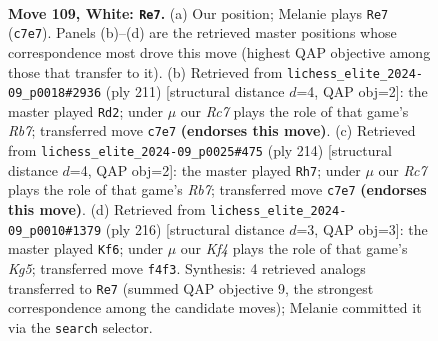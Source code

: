 \documentclass[11pt]{article}
\begin{document}
\clearpage

\begin{figure}[p]\centering
\begin{subfigure}{0.46\textwidth}\centering
\resizebox{\linewidth}{!}{%
\newchessgame
\chessboard[
  setfen={8/2R5/8/3k4/5KP1/1N6/7r/8 w - - 1 109},
  showmover=false,
  pgfstyle=straightmove, color=movearrow, markmove={c7-e7}
]}
\caption{}
\end{subfigure}\hfill
\begin{subfigure}{0.46\textwidth}\centering
\resizebox{\linewidth}{!}{%
\newchessgame
\chessboard[
  setfen={8/8/8/8/5pk1/R7/1r6/6K1 b - - 11 106},
  showmover=false,
  pgfstyle=straightmove, color=movearrow, markmove={b2-d2}
]}
\caption{}
\end{subfigure}
\\[4pt]
\begin{subfigure}{0.46\textwidth}\centering
\resizebox{\linewidth}{!}{%
\newchessgame
\chessboard[
  setfen={4k3/1R6/2r5/5PK1/8/8/8/8 w - - 3 108},
  showmover=false,
  pgfstyle=straightmove, color=movearrow, markmove={b7-h7}
]}
\caption{}
\end{subfigure}\hfill
\begin{subfigure}{0.46\textwidth}\centering
\resizebox{\linewidth}{!}{%
\newchessgame
\chessboard[
  setfen={8/7k/8/5PK1/8/4R3/8/r7 w - - 0 109},
  showmover=false,
  pgfstyle=straightmove, color=movearrow, markmove={g5-f6}
]}
\caption{}
\end{subfigure}
\caption{\textbf{Move 109, White: \texttt{Re7}.} (a) Our position; Melanie plays \texttt{Re7} (\texttt{c7e7}). Panels (b)--(d) are the retrieved master positions whose correspondence most drove this move (highest QAP objective among those that transfer to it). (b) Retrieved from \texttt{lichess\_elite\_2024-09\_p0018\#2936} (ply 211) [structural distance $d$=4, QAP obj=2]: the master played \texttt{Rd2}; under $\mu$ our \emph{Rc7} plays the role of that game's \emph{Rb7}; transferred move \texttt{c7e7} \textbf{(endorses this move)}. (c) Retrieved from \texttt{lichess\_elite\_2024-09\_p0025\#475} (ply 214) [structural distance $d$=4, QAP obj=2]: the master played \texttt{Rh7}; under $\mu$ our \emph{Rc7} plays the role of that game's \emph{Rb7}; transferred move \texttt{c7e7} \textbf{(endorses this move)}. (d) Retrieved from \texttt{lichess\_elite\_2024-09\_p0010\#1379} (ply 216) [structural distance $d$=3, QAP obj=3]: the master played \texttt{Kf6}; under $\mu$ our \emph{Kf4} plays the role of that game's \emph{Kg5}; transferred move \texttt{f4f3}. Synthesis: 4 retrieved analogs transferred to \texttt{Re7} (summed QAP objective 9, the strongest correspondence among the candidate moves); Melanie committed it via the \texttt{search} selector.}
\label{fig:thought-m216}
\end{figure}
\end{document}
